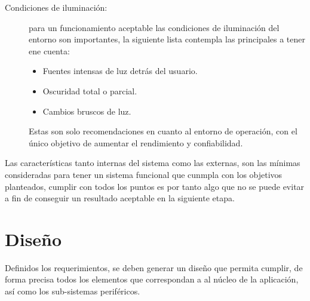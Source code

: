 \documentclass[12pt]{book} %
\begin{document}
\begin{description}
			\item[Condiciones de iluminación:] para un funcionamiento aceptable las condiciones de iluminación del entorno son importantes, 
			la siguiente lista  contempla las principales a tener ene cuenta:
			\begin{multicols}{2}
				\begin{itemize}
					\item Fuentes intensas de luz detrás del usuario.
					\item Oscuridad total o parcial.
					\item Cambios bruscos de luz.
				\end{itemize}
				\end{multicols}
			Estas son solo recomendaciones en cuanto al entorno de operación, con el único objetivo de aumentar el rendimiento y confiabilidad.
		\end{description}
		Las características tanto internas del sistema como las externas, son las mínimas consideradas para tener un sistema funcional que cunmpla con 
		los objetivos planteados, cumplir con todos los puntos es por tanto algo que no se puede evitar a fin de conseguir un resultado aceptable en la
		siguiente etapa.

\newpage
\section{Diseño}
	Definidos los requerimientos, se deben generar un diseño que permita cumplir, de forma precisa todos los elementos que correspondan a 
	al núcleo de la aplicación, así como los sub-sistemas periféricos.
\end{document}
